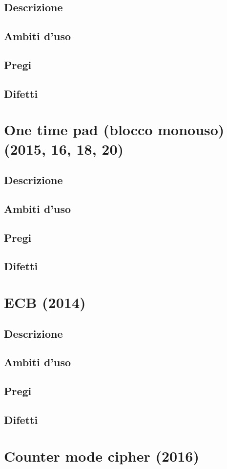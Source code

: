 \documentclass[10pt,oneside,a4paper]{article}
\begin{document}
\subsection{Descrizione}
\subsection{Ambiti d'uso}
\subsection{Pregi}
\subsection{Difetti}
\section{One time pad (blocco monouso) (2015, 16, 18, 20)}
\subsection{Descrizione}
\subsection{Ambiti d'uso}
\subsection{Pregi}
\subsection{Difetti}
\section{ECB (2014)}
\subsection{Descrizione}
\subsection{Ambiti d'uso}
\subsection{Pregi}
\subsection{Difetti}
\section{Counter mode cipher (2016)}
\end{document}
